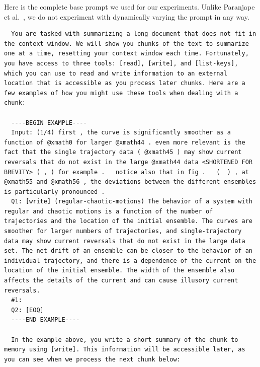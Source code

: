 \documentclass{article}
\begin{document}
Here is the complete base prompt we used for our experiments. Unlike Paranjape et al.~\cite{paranjape2023art}, we do not experiment with dynamically varying the prompt in any way.


\begin{lstlisting}
  You are tasked with summarizing a long document that does not fit in the context window. We will show you chunks of the text to summarize one at a time, resetting your context window each time. Fortunately, you have access to three tools: [read], [write], and [list-keys], which you can use to read and write information to an external location that is accessible as you process later chunks. Here are a few examples of how you might use these tools when dealing with a chunk:

  ----BEGIN EXAMPLE----
  Input: (1/4) first , the curve is significantly smoother as a function of @xmath0 for larger @xmath44 . even more relevant is the fact that the single trajectory data ( @xmath45 ) may show current reversals that do not exist in the large @xmath44 data <SHORTENED FOR BREVITY> ( , ) for example .   notice also that in fig .   (  ) , at @xmath55 and @xmath56 , the deviations between the different ensembles is particularly pronounced .
  Q1: [write] (regular-chaotic-motions) The behavior of a system with regular and chaotic motions is a function of the number of trajectories and the location of the initial ensemble. The curves are smoother for larger numbers of trajectories, and single-trajectory data may show current reversals that do not exist in the large data set. The net drift of an ensemble can be closer to the behavior of an individual trajectory, and there is a dependence of the current on the location of the initial ensemble. The width of the ensemble also affects the details of the current and can cause illusory current reversals.
  #1:
  Q2: [EOQ]
  ----END EXAMPLE----

  In the example above, you write a short summary of the chunk to memory using [write]. This information will be accessible later, as you can see when we process the next chunk below:


\end{lstlisting}
\end{document}
